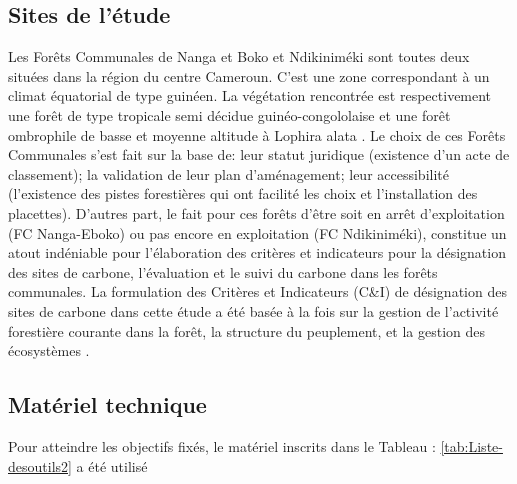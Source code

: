 \documentclass[
  12pt,
  a4paper,
  extrafontsizes,
  onecolumn,
  openright]{book}
\theoremstyle{definition}
\theoremstyle{definition}
\theoremstyle{definition}
\theoremstyle{definition}
\theoremstyle{remark}
\begin{document}
\hypertarget{sites-de-luxe9tude}{%
\subsection{Sites de l'étude}\label{sites-de-luxe9tude}}

Les Forêts Communales de Nanga et Boko et Ndikiniméki sont toutes deux situées dans la région du centre Cameroun. C'est une zone correspondant à un climat équatorial de type guinéen. La végétation rencontrée est respectivement une forêt de type tropicale semi décidue guinéo-congololaise \citep{Letouzey1985} et une forêt ombrophile de basse et moyenne altitude à Lophira alata \citep{Letouzey1958}. Le choix de ces Forêts Communales s'est fait sur la base de: leur statut juridique (existence d'un acte de classement); la validation de leur plan d'aménagement; leur accessibilité (l'existence des pistes forestières qui ont facilité les choix et l'installation des placettes). D'autres part, le fait pour ces forêts d'être soit en arrêt d'exploitation (FC Nanga-Eboko) ou pas encore en exploitation (FC Ndikiniméki), constitue un atout indéniable pour l'élaboration des critères et indicateurs pour la désignation des sites de carbone, l'évaluation et le suivi du carbone dans les forêts communales. La formulation des Critères et Indicateurs (C\&I) de désignation des sites de carbone dans cette étude a été basée à la fois sur la gestion de l'activité forestière courante dans la forêt, la structure du peuplement, et la gestion des écosystèmes \citep{Nivert2012}.

\hypertarget{matuxe9riel-technique}{%
\subsection{Matériel technique}\label{matuxe9riel-technique}}

Pour atteindre les objectifs fixés, le matériel inscrits dans le Tableau : \ref{tab:Liste-desoutils2} a été utilisé
\end{document}

